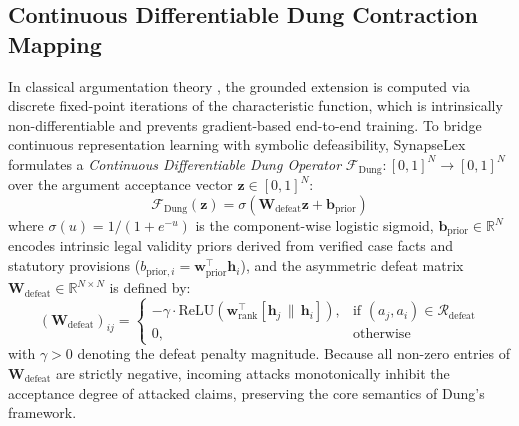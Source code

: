 \documentclass[11pt,a4paper]{article}
\begin{document}
\subsection{Continuous Differentiable Dung Contraction Mapping}
\label{sec:dung_contraction}
In classical argumentation theory \citep{dung1995acceptability}, the grounded extension is computed via discrete fixed-point iterations of the characteristic function, which is intrinsically non-differentiable and prevents gradient-based end-to-end training. To bridge continuous representation learning with symbolic defeasibility, SynapseLex formulates a \textit{Continuous Differentiable Dung Operator} $\mathcal{F}_{\text{Dung}}: [0, 1]^N \to [0, 1]^N$ over the argument acceptance vector $\mathbf{z} \in [0, 1]^N$:
\begin{equation}
\label{eq:dung_operator}
\mathcal{F}_{\text{Dung}}(\mathbf{z}) = \sigma\left( \mathbf{W}_{\text{defeat}} \mathbf{z} + \mathbf{b}_{\text{prior}} \right)
\end{equation}
where $\sigma(u) = 1/(1 + e^{-u})$ is the component-wise logistic sigmoid, $\mathbf{b}_{\text{prior}} \in \mathbb{R}^N$ encodes intrinsic legal validity priors derived from verified case facts and statutory provisions ($b_{\text{prior}, i} = \mathbf{w}_{\text{prior}}^\top \mathbf{h}_i$), and the asymmetric defeat matrix $\mathbf{W}_{\text{defeat}} \in \mathbb{R}^{N \times N}$ is defined by:
\begin{equation}
\label{eq:w_defeat}
(\mathbf{W}_{\text{defeat}})_{ij} = \begin{cases}
-\gamma \cdot \mathrm{ReLU}(\mathbf{w}_{\text{rank}}^\top [\mathbf{h}_j \,\|\, \mathbf{h}_i]), & \text{if } (a_j, a_i) \in \mathcal{R}_{\text{defeat}} \\
0, & \text{otherwise}
\end{cases}
\end{equation}
with $\gamma > 0$ denoting the defeat penalty magnitude. Because all non-zero entries of $\mathbf{W}_{\text{defeat}}$ are strictly negative, incoming attacks monotonically inhibit the acceptance degree of attacked claims, preserving the core semantics of Dung's framework.
\end{document}
